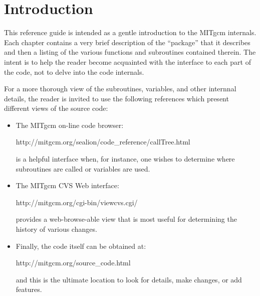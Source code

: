 %
%

\chapter{Introduction}

This reference guide is intended as a gentle introduction to the
MITgcm internals.  Each chapter contains a very brief description of
the ``package'' that it describes and then a listing of the various
functions and subroutines contained therein.  The intent is to help the
reader become acquainted with the interface to each part of the code,
not to delve into the code internals.

For a more thorough view of the subroutines, variables, and other
internnal details, the reader is invited to use the following
references which present different views of the source code:
\begin{itemize}
\item The MITgcm on-line code browser:
  \begin{center}
    {http://mitgcm.org/sealion/code_reference/callTree.html}
  \end{center}
  is a helpful interface when, for instance, one wishes to determine
  where subroutines are called or variables are used.

\item The MITgcm CVS Web interface:
  \begin{center}
    {http://mitgcm.org/cgi-bin/viewcvs.cgi/}
  \end{center}
  provides a web-browse-able view that is most useful for determining
  the history of various changes.

\item Finally, the code itself can be obtained at:
  \begin{center}
    {http://mitgcm.org/source_code.html}
  \end{center}
  and this is the ultimate location to look for details, make changes,
  or add features.

\end{itemize}

